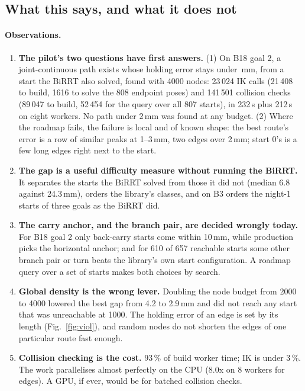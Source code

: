 \subsection{What this says, and what it does not}

\paragraph{Observations.}
\begin{enumerate}[nosep,label=(\roman*)]
  \item \textbf{The pilot's two questions have first answers.} (1) On B18 goal 2,
        a joint-continuous path exists whose holding error stays under
        \PrmBestGap\,mm, from a start the BiRRT also solved, found with 4000
        nodes: 23\,024 IK calls (21\,408 to build, 1616 to solve the 808 endpoint
        poses) and 141\,501 collision checks (89\,047 to build, 52\,454 for the
        query over all 807 starts), in 232\,s plus 212\,s on eight workers. No
        path under 2\,mm was found at any budget. (2) Where the
        roadmap fails, the failure is local and of known shape: the best route's
        error is a row of similar peaks at 1--3\,mm, two edges over 2\,mm; start
        0's is a few long edges right next to the start.
  \item \textbf{The gap is a useful difficulty measure without running the BiRRT.}
        It separates the starts the BiRRT solved from those it did not
        (median 6.8 against 24.3\,mm), orders the library's classes, and on B3
        orders the night-1 starts of three goals as the BiRRT did.
  \item \textbf{The carry anchor, and the branch pair, are decided wrongly today.}
        For B18 goal 2 only back-carry starts come within 10\,mm, while
        production picks the horizontal anchor; and for 610 of 657 reachable
        starts some other branch pair or turn beats the library's own start
        configuration. A roadmap query over a set of starts makes both choices
        by search.
  \item \textbf{Global density is the wrong lever.} Doubling the node budget
        from 2000 to 4000 lowered the best gap from 4.2 to 2.9\,mm and did not
        reach any start that was unreachable at 1000. The holding error of an
        edge is set by its length (Fig.~\ref{fig:viol}), and random nodes do
        not shorten the edges of one particular route fast enough.
  \item \textbf{Collision checking is the cost.} 93\,\% of build worker time;
        IK is under 3\,\%. The work parallelises almost perfectly on the CPU
        (8.0x on 8 workers for edges). A GPU, if ever, would be for batched
        collision checks.
\end{enumerate}

